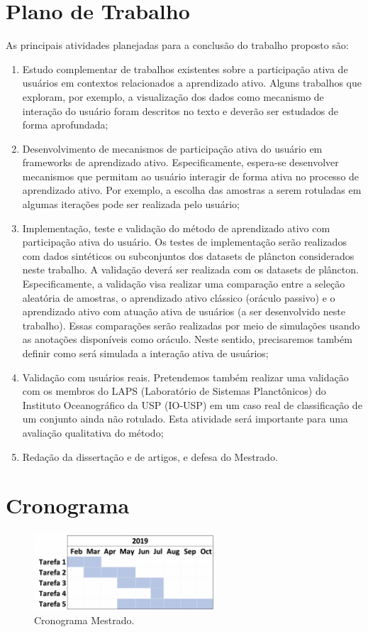\section{Plano de Trabalho}
\label{sec:Plano_de_Trabalho}

As principais atividades planejadas para a conclusão do trabalho proposto são:

\begin{enumerate}
  \item Estudo complementar de trabalhos existentes sobre a participação ativa de usuários em contextos relacionados a aprendizado ativo. Alguns trabalhos que exploram, por exemplo, a visualização dos dados como mecanismo de interação do usuário foram descritos no texto e deverão ser estudados de forma aprofundada;  
  
  \item Desenvolvimento de mecanismos de participação ativa do usuário em  frameworks de aprendizado ativo. Especificamente, espera-se desenvolver mecanismos que permitam ao usuário interagir de forma ativa no processo de aprendizado ativo. Por exemplo, a escolha das amostras a serem rotuladas em algumas iterações pode ser realizada pelo usuário;
  
  \item Implementação, teste e validação do método de aprendizado ativo com participação ativa do usuário. Os testes de implementação serão realizados com dados sintéticos ou subconjuntos dos datasets de plâncton considerados neste trabalho. A validação deverá ser realizada com os datasets de plâncton. Especificamente, a validação visa realizar uma comparação entre a seleção aleatória de amostras, o aprendizado ativo clássico (oráculo passivo) e o aprendizado ativo com atuação ativa de usuários (a ser desenvolvido neste trabalho). Essas comparações serão realizadas por meio de simulações usando as anotações disponíveis como oráculo. Neste sentido, precisaremos também definir como será simulada a interação ativa de usuários;
  
  \item Validação com usuários reais. Pretendemos também realizar uma validação com os membros do LAPS (Laboratório de Sistemas Planctônicos) do Instituto Oceanográfico da USP (IO-USP) em um caso real de classificação de um conjunto ainda não rotulado. Esta atividade será importante para uma avaliação qualitativa do método;
  
  \item Redação da dissertação e de artigos, e defesa do Mestrado.
\end{enumerate}


\section{Cronograma}
\label{sec:cronograma}


\begin{figure}
  \centering
  \includegraphics[width=0.6\textwidth]{figures/cronograma.png}
  \caption{Cronograma Mestrado.}
  \label{fig:cronograma}
\end{figure}
